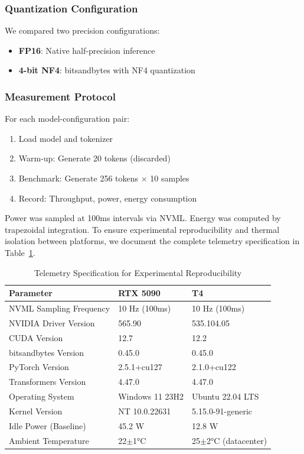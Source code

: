 \documentclass[11pt]{article}
\begin{document}
\subsubsection{Quantization Configuration}

We compared two precision configurations:
\begin{itemize}
    \item \textbf{FP16}: Native half-precision inference
    \item \textbf{4-bit NF4}: bitsandbytes with NF4 quantization
\end{itemize}

\subsubsection{Measurement Protocol}

For each model-configuration pair:
\begin{enumerate}
    \item Load model and tokenizer
    \item Warm-up: Generate 20 tokens (discarded)
    \item Benchmark: Generate 256 tokens $\times$ 10 samples
    \item Record: Throughput, power, energy consumption
\end{enumerate}

Power was sampled at 100ms intervals via NVML. Energy was computed by trapezoidal integration. To ensure experimental reproducibility and thermal isolation between platforms, we document the complete telemetry specification in Table~\ref{tab:telemetry}.

\begin{table}[h]
\centering
\caption{Telemetry Specification for Experimental Reproducibility}
\label{tab:telemetry}
\begin{tabular}{lll}
\toprule
\textbf{Parameter} & \textbf{RTX 5090} & \textbf{T4} \\
\midrule
NVML Sampling Frequency & 10 Hz (100ms) & 10 Hz (100ms) \\
NVIDIA Driver Version & 565.90 & 535.104.05 \\
CUDA Version & 12.7 & 12.2 \\
bitsandbytes Version & 0.45.0 & 0.45.0 \\
PyTorch Version & 2.5.1+cu127 & 2.1.0+cu122 \\
Transformers Version & 4.47.0 & 4.47.0 \\
Operating System & Windows 11 23H2 & Ubuntu 22.04 LTS \\
Kernel Version & NT 10.0.22631 & 5.15.0-91-generic \\
Idle Power (Baseline) & 45.2 W & 12.8 W \\
Ambient Temperature & 22$\pm$1°C & 25$\pm$2°C (datacenter) \\
\bottomrule
\end{tabular}
\end{table}
\end{document}
